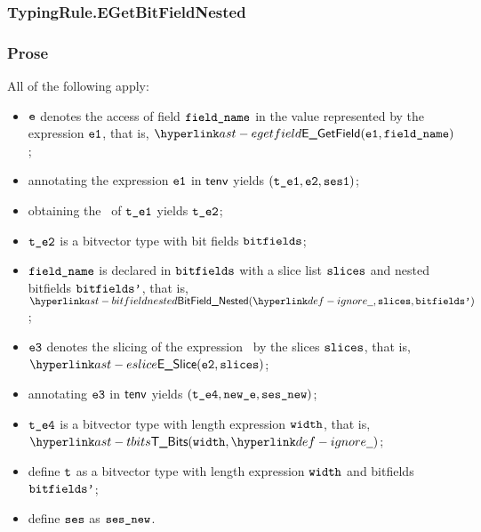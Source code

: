 \subsubsection{TypingRule.EGetBitFieldNested\label{sec:TypingRule.EGetBitFieldNested}}
\subsubsection{Prose}
All of the following apply:
\begin{itemize}
  \item $\texttt{e}$ denotes the access of field $\texttt{field\_name}$ in the value represented by the expression $\texttt{e1}$, that is, $\EGetField(\veone, \fieldname)$;
  \item annotating the expression $\texttt{e1}$ in $\textsf{tenv}$ yields $(\texttt{t\_e1}, \texttt{e2}, \texttt{ses1})$\ProseOrTypeError;
  \item obtaining the \underlyingtype\ of $\texttt{t\_e1}$ yields $\texttt{t\_e2}$\ProseOrTypeError;
  \item $\texttt{t\_e2}$ is a bitvector type with bit fields $\texttt{bitfields}$;
  \item $\texttt{field\_name}$ is declared in $\texttt{bitfields}$ with a slice list $\texttt{slices}$ and nested bitfields $\texttt{bitfields'}$, that is,
        $\BitFieldNested(\Ignore, \slices, \bitfieldsp)$;
  \item $\texttt{e3}$ denotes the slicing of the expression \vetwo\ by the slices $\texttt{slices}$, that is, \\ $\ESlice(\vetwo, \slices)$;
  \item annotating $\texttt{e3}$ in $\textsf{tenv}$ yields $(\texttt{t\_e4}, \texttt{new\_e}, \texttt{ses\_new})$\ProseOrTypeError;
  \item $\texttt{t\_e4}$ is a bitvector type with length expression $\texttt{width}$, that is, $\TBits(\width, \Ignore)$;
  \item define $\texttt{t}$ as a bitvector type with length expression $\texttt{width}$ and bitfields $\texttt{bitfields'}$;
  \item define $\texttt{ses}$ as $\texttt{ses\_new}$.
\end{itemize}
